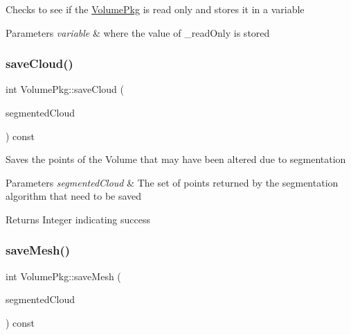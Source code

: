 Checks to see if the \hyperlink{classVolumePkg}{Volume\+Pkg} is read only and stores it in a variable 
\begin{DoxyParams}{Parameters}
{\em variable} & where the value of \+\_\+read\+Only is stored \\
\hline
\end{DoxyParams}
\hypertarget{classVolumePkg_ad8e7c0e7bf2ae1b6771533fe60e91625}{}\label{classVolumePkg_ad8e7c0e7bf2ae1b6771533fe60e91625} 
\subsubsection{\texorpdfstring{save\+Cloud()}{saveCloud()}}
{\footnotesize\ttfamily int Volume\+Pkg\+::save\+Cloud (\begin{DoxyParamCaption}\item[{const volcart\+::\+Ordered\+Point\+Set$<$ volcart\+::\+Point3d $>$ \&}]{segmented\+Cloud }\end{DoxyParamCaption}) const}

Saves the points of the Volume that may have been altered due to segmentation 
\begin{DoxyParams}{Parameters}
{\em segmented\+Cloud} & The set of points returned by the segmentation algorithm that need to be saved \\
\hline
\end{DoxyParams}
\begin{DoxyReturn}{Returns}
Integer indicating success 
\end{DoxyReturn}
\hypertarget{classVolumePkg_a8b8474853f26ef0c08cd37ded220c344}{}\label{classVolumePkg_a8b8474853f26ef0c08cd37ded220c344} 
\subsubsection{\texorpdfstring{save\+Mesh()}{saveMesh()}\hspace{0.1cm}{\footnotesize\ttfamily [1/2]}}
{\footnotesize\ttfamily int Volume\+Pkg\+::save\+Mesh (\begin{DoxyParamCaption}\item[{const volcart\+::\+Ordered\+Point\+Set$<$ volcart\+::\+Point3d $>$ \&}]{segmented\+Cloud }\end{DoxyParamCaption}) const}

